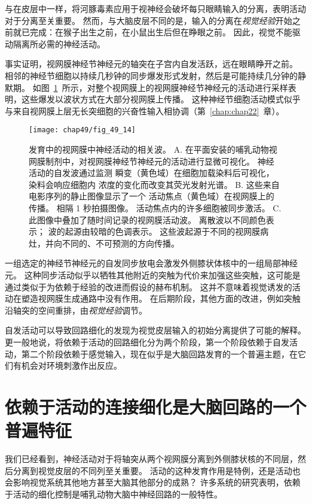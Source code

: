 与在皮层中一样，将河豚毒素应用于视神经会破坏每只眼睛输入的分离，表明活动对于分离至关重要。
然而，与大脑皮层不同的是，输入的分离在\textit{视觉经验}开始之前就已完成：在猴子出生之前，在小鼠出生后但在睁眼之前。
因此，视觉不能驱动隔离所必需的神经活动。


事实证明，视网膜神经节神经元的轴突在子宫内自发活跃，远在眼睛睁开之前。
相邻的神经节细胞以持续几秒钟的同步爆发形式发射，然后是可能持续几分钟的静默期。
如图~\ref{fig:49_14}~所示，对整个视网膜上的视网膜神经节神经元的活动进行采样表明，这些爆发以波状方式在大部分视网膜上传播。
这种神经节细胞活动模式似乎与来自视网膜上层无长突细胞的兴奋性输入相协调（第~\ref{chap:chap22}~章）。


\begin{figure}[htbp]
	\centering
	\texttt{[image: chap49/fig\_49\_14]}
	\caption{发育中的视网膜中神经活动的相关波。
		A. 在平面安装的哺乳动物视网膜制剂中，对视网膜神经节神经元的活动进行显微可视化。
		神经活动的自发波通过监测  瞬变（黄色域）在细胞加载染料后可视化，染料会响应细胞内  浓度的变化而改变其荧光发射光谱。
		B. 这些来自电影序列的静止图像显示了一个  活动焦点（黄色域）在视网膜上的传播。
		相隔 1 秒拍摄图像。
		活动焦点内的许多细胞被同步激活。
		C. 此图像中叠加了随时间记录的视网膜活动波。
		离散波以不同颜色表示；
		波的起源由较暗的色调表示。
		这些波起源于不同的视网膜病灶，并向不同的、不可预测的方向传播。}
	\label{fig:49_14}
\end{figure}


一组选定的神经节神经元的自发同步放电会激发外侧膝状体核中的一组局部神经元。
这种同步活动似乎以牺牲其他附近的突触为代价来加强这些突触，这可能是通过类似于为依赖于经验的改进而假设的赫布机制。
这并不意味着视觉诱发的活动在塑造视网膜生成通路中没有作用。
在后期阶段，其他方面的改进，例如突触沿轴突的空间重排，由\textit{视觉经验}调节。


自发活动可以导致回路细化的发现为视觉皮层输入的初始分离提供了可能的解释。
更一般地说，将依赖于活动的回路细化分为两个阶段，第一个阶段依赖于自发活动，第二个阶段依赖于感觉输入，现在似乎是大脑回路发育的一个普遍主题，在它们有机会对环境刺激作出反应。



\section{依赖于活动的连接细化是大脑回路的一个普遍特征}

我们已经看到，神经活动对于将轴突从两个视网膜分离到外侧膝状核的不同层，然后分离到视觉皮层的不同列至关重要。
活动的这种发育作用是特例，还是活动也会影响视觉系统其他地方甚至大脑其他部分的成熟？
许多系统的研究表明，依赖于活动的细化控制是哺乳动物大脑中神经回路的一般特性。



